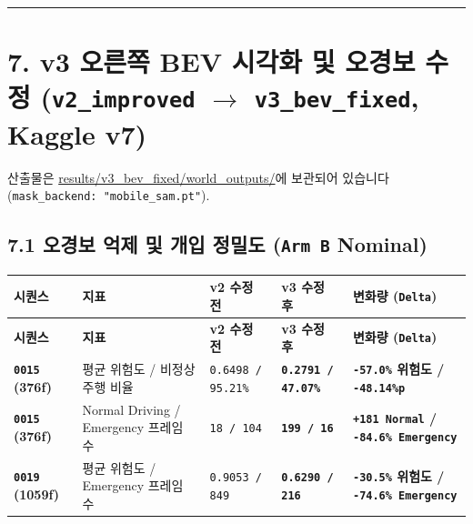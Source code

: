 \documentclass[10.5pt,a4paper]{article}
\begin{document}
\par\noindent\rule{\textwidth}{0.4pt}\par\medskip

\section{7. v3 오른쪽 BEV 시각화 및 오경보 수정 (\texttt{v2\_\allowbreak{}improved} $\rightarrow$ \texttt{v3\_\allowbreak{}bev\_\allowbreak{}fixed}, Kaggle v7)}

산출물은 \href{https://github.com/Heisnotanimposter/Totalcare\_autonomous\_driving\_Yolov5/tree/main/results/v3\_bev\_fixed/world\_outputs}{results/v3\_bev\_fixed/world\_outputs/}에 보관되어 있습니다(\texttt{mask\_\allowbreak{}backend:\allowbreak{} "mobile\_\allowbreak{}sam.\allowbreak{}pt"}).


\subsection{7.1 오경보 억제 및 개입 정밀도 (\texttt{Arm B} Nominal)}

\begin{footnotesize}
\setlength{\tabcolsep}{4pt}
\setlength{\LTleft}{0pt}\setlength{\LTright}{0pt}
\begin{longtable}{>{\raggedright\arraybackslash}p{} >{\raggedright\arraybackslash}p{} >{\raggedright\arraybackslash}p{} >{\raggedright\arraybackslash}p{} >{\raggedright\arraybackslash}p{}}
\toprule
\textbf{시퀀스} & \textbf{지표} & \textbf{v2 수정 전} & \textbf{v3 수정 후} & \textbf{변화량 (\texttt{Delta})} \\
\midrule
\endfirsthead
\toprule
\textbf{시퀀스} & \textbf{지표} & \textbf{v2 수정 전} & \textbf{v3 수정 후} & \textbf{변화량 (\texttt{Delta})} \\
\midrule
\endhead
\bottomrule
\endfoot
\textbf{\texttt{0015} (376f)} & 평균 위험도 / 비정상 주행 비율 & \texttt{0.\allowbreak{}6498 /\allowbreak{} 95.\allowbreak{}21\%} & \textbf{\texttt{0.\allowbreak{}2791 /\allowbreak{} 47.\allowbreak{}07\%}} & \textbf{\texttt{-\allowbreak{}57.\allowbreak{}0\%} 위험도 / \texttt{-\allowbreak{}48.\allowbreak{}14\%p}} \\
\textbf{\texttt{0015} (376f)} & Normal Driving / Emergency 프레임 수 & \texttt{18 /\allowbreak{} 104} & \textbf{\texttt{199 /\allowbreak{} 16}} & \textbf{\texttt{+181 Normal} / \texttt{-\allowbreak{}84.\allowbreak{}6\% Emergency}} \\
\textbf{\texttt{0019} (1059f)} & 평균 위험도 / Emergency 프레임 수 & \texttt{0.\allowbreak{}9053 /\allowbreak{} 849} & \textbf{\texttt{0.\allowbreak{}6290 /\allowbreak{} 216}} & \textbf{\texttt{-\allowbreak{}30.\allowbreak{}5\%} 위험도 / \texttt{-\allowbreak{}74.\allowbreak{}6\% Emergency}} \\
\end{longtable}
\end{footnotesize}
\end{document}
